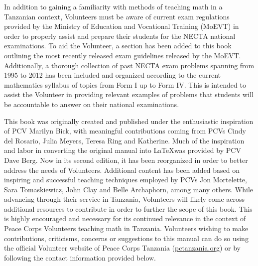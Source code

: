 In addition to gaining a familiarity with methods of teaching math in a Tanzanian context, Volunteers must be aware of current exam regulations provided by the Ministry of Education and Vocational Training (MoEVT) in order to properly assist and prepare their students for the NECTA national examinations. To aid the Volunteer, a section has been added to this book outlining the most recently released exam guidelines released by the MoEVT. Additionally, a thorough collection of past NECTA exam problems spanning from 1995 to 2012 has been included and organized according to the current mathematics syllabus of topics from Form I up to Form IV. This is intended to assist the Volunteer in providing relevant examples of problems that students will be accountable to answer on their national examinations.

This book was originally created and published under the enthusiastic inspiration of PCV Marilyn Bick, with meaningful contributions coming from PCVs Cindy del Rosario, Julia Meyers, Teresa Ring and Katherine. Much of the inspiration and labor in converting the original manual into \LaTeX was provided by PCV Dave Berg. Now in its second edition, it has been reorganized in order to better address the needs of Volunteers. Additional content has been added based on inspiring and successful teaching techniques employed by PCVs Jon Mortelette, Sara Tomaskiewicz, John Clay and Belle Archaphorn, among many others. While advancing through their service in Tanzania, Volunteers will likely come across additional resources to contribute in order to further the scope of this book. This is highly encouraged and necessary for its continued relevance in the context of Peace Corps Volunteers teaching math in Tanzania. Volunteers wishing to make contributions, criticisms, concerns or suggestions to this manual can do so using the official Volunteer website of Peace Corps Tanzania (\href{http:/www.pctanzania.org}{pctanzania.org}) or by following the contact information provided below.

